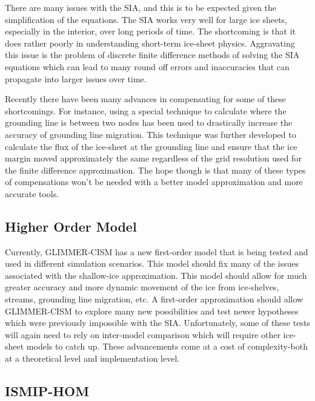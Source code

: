 There are many issues with the SIA, and this is to be expected given the simplification of the equations.  The SIA works very well for large ice sheets, especially in the interior, over long periods of time.  The shortcoming is that it does rather poorly in understanding short-term ice-sheet physics.  Aggravating this issue is the problem of discrete finite difference methods of solving the SIA equations which can lead to many round off errors and inaccuracies that can propagate into larger issues over time.\citep{Bergetal2006b}


Recently there have been many advances in compensating for some of these shortcomings.  For instance, using a special technique to calculate where the grounding line is between two nodes has been used to drastically increase the accuracy of grounding line migration. \citet{2004JF000202,Pattyn2006JGR}  This technique was further developed to calculate the flux of the ice-sheet at the grounding line and ensure that the ice margin moved approximately the same regardless of the grid resolution used for the finite difference approximation. \citep{Pollard:2009}  The hope though is that many of these types of compensations won't be needed with a better model approximation and more accurate tools.


\subsection{Higher Order Model}

Currently, GLIMMER-CISM has a new first-order model that is being tested and used in different simulation scenarios.  This model should fix many of the issues associated with the shallow-ice approximation.  This model should allow for much greater accuracy and more dynamic movement of the ice from ice-shelves, streams, grounding line migration, etc.  A first-order approximation should allow GLIMMER-CISM to explore many new possibilities and test newer hypotheses which were previously impossible with the SIA.  Unfortunately, some of these tests will again need to rely on inter-model comparison which will require other ice-sheet models to catch up.  These advancements come at a cost of complexity-both at a theoretical level and implementation level.

\subsection{ISMIP-HOM}

